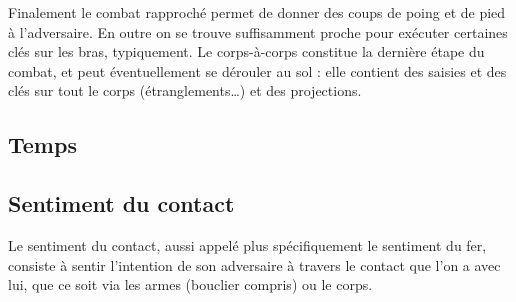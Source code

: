 Finalement le combat rapproché permet de donner des coups de poing et de pied à l'adversaire.
En outre on se trouve suffisamment proche pour exécuter certaines clés sur les bras, typiquement.
Le corps-à-corps constitue la dernière étape du combat, et peut éventuellement se dérouler au sol : elle contient des saisies et des clés sur tout le corps (étranglements…) et des projections.



\subsection{Temps}




\subsection{Sentiment du contact}


Le sentiment du contact, aussi appelé plus spécifiquement le sentiment du fer, consiste à sentir l'intention de son adversaire à travers le contact que l'on a avec lui, que ce soit via les armes (bouclier compris) ou le corps.


